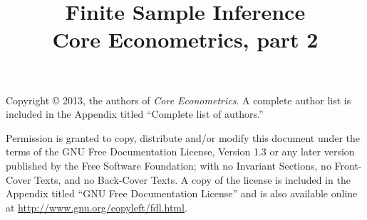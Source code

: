 \documentclass[nohyper]{tufte-handout}
\title[Finite Sample Inference]%
{Finite Sample Inference \\
  Core Econometrics, part 2}
\begin{document}
\maketitle

\bigskip\noindent%
Copyright © 2013, the authors of \textit{Core Econometrics}.  A
complete author list is included in the Appendix titled ``Complete
list of authors.''

Permission is granted to copy, distribute and/or modify this document
under the terms of the GNU Free Documentation License, Version 1.3 or
any later version published by the Free Software Foundation; with no
Invariant Sections, no Front-Cover Texts, and no Back-Cover Texts.  A
copy of the license is included in the Appendix titled ``GNU Free
Documentation License'' and is also available online at
\url{http://www.gnu.org/copyleft/fdl.html}.

\tableofcontents














\end{document}
